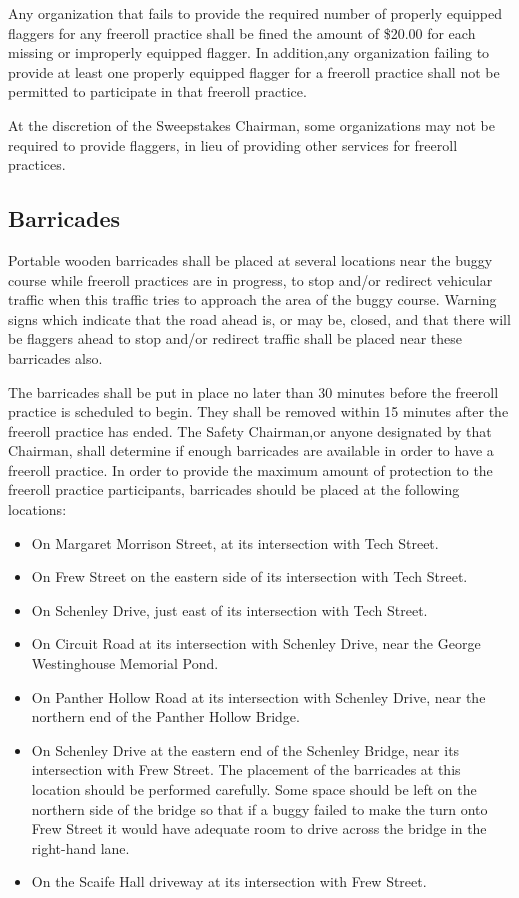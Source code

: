 \documentclass[openany]{book}
\begin{document}
Any organization that fails to provide the required number of properly equipped flaggers for any freeroll practice shall be fined the amount of \$20.00 for each missing or improperly equipped flagger. In addition,any organization failing to provide at least one properly equipped flagger for a freeroll practice shall not be permitted to participate in that freeroll practice.

At the discretion of the Sweepstakes Chairman, some organizations may not be required to provide flaggers, in lieu of providing other services for freeroll practices.

\subsection{Barricades}

Portable wooden barricades shall be placed at several locations near the buggy course while freeroll practices are in progress, to stop and/or redirect vehicular traffic when this traffic tries to approach the area of the buggy course. Warning signs which indicate that the road ahead is, or may be, closed, and that there will be flaggers ahead to stop and/or redirect traffic shall be placed near these barricades also.

The barricades shall be put in place no later than 30 minutes before the freeroll practice is scheduled to begin. They shall be removed within 15 minutes after the freeroll practice has ended. The Safety Chairman,or anyone designated by that Chairman, shall determine if enough barricades are available in order to have a freeroll practice. In order to provide the maximum amount of protection to the freeroll practice participants, barricades should be placed at the following locations:
\begin{itemize}
	\item On Margaret Morrison Street, at its intersection with Tech Street.
	\item On Frew Street on the eastern side of its intersection with Tech Street.
	\item On Schenley Drive, just east of its intersection with Tech Street.
	\item On Circuit Road at its intersection with Schenley Drive, near the George Westinghouse Memorial Pond.
	\item On Panther Hollow Road at its intersection with Schenley Drive, near the northern end of the Panther Hollow Bridge.
	\item On Schenley Drive at the eastern end of the Schenley Bridge, near its intersection with Frew Street. The placement of the barricades at this location should be performed carefully. Some space should be left on the northern side of the bridge so that if a buggy failed to make the turn onto Frew Street it would have adequate room to drive across the bridge in the right-hand lane.
	\item On the Scaife Hall driveway at its intersection with Frew Street.
\end{itemize}
\end{document}
